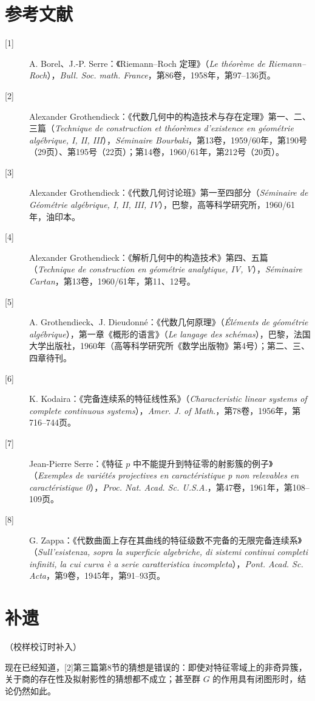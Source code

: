 \section*{参考文献}
\begin{description}
\item[{[1]}] A. Borel、J.-P. Serre：《Riemann--Roch 定理》（\textit{Le théorème de Riemann--Roch}），\textit{Bull. Soc. math. France}，第86卷，1958年，第97--136页。
\item[{[2]}] Alexander Grothendieck：《代数几何中的构造技术与存在定理》第一、二、三篇（\textit{Technique de construction et théorèmes d'existence en géométrie algébrique, I, II, III}），\textit{Séminaire Bourbaki}，第13卷，1959/60年，第190号（29页）、第195号（22页）；第14卷，1960/61年，第212号（20页）。
\item[{[3]}] Alexander Grothendieck：《代数几何讨论班》第一至四部分（\textit{Séminaire de Géométrie algébrique, I, II, III, IV}），巴黎，高等科学研究所，1960/61年，油印本。
\item[{[4]}] Alexander Grothendieck：《解析几何中的构造技术》第四、五篇（\textit{Technique de construction en géométrie analytique, IV, V}），\textit{Séminaire Cartan}，第13卷，1960/61年，第11、12号。
\item[{[5]}] A. Grothendieck、J. Dieudonné：《代数几何原理》（\textit{Éléments de géométrie algébrique}），第一章《概形的语言》（\textit{Le langage des schémas}），巴黎，法国大学出版社，1960年（高等科学研究所《数学出版物》第4号）；第二、三、四章待刊。
\item[{[6]}] K. Kodaira：《完备连续系的特征线性系》（\textit{Characteristic linear systems of complete continuous systems}），\textit{Amer. J. of Math.}，第78卷，1956年，第716--744页。
\item[{[7]}] Jean-Pierre Serre：《特征 $p$ 中不能提升到特征零的射影簇的例子》（\textit{Exemples de variétés projectives en caractéristique p non relevables en caractéristique 0}），\textit{Proc. Nat. Acad. Sc. U.S.A.}，第47卷，1961年，第108--109页。
\item[{[8]}] G. Zappa：《代数曲面上存在其曲线的特征级数不完备的无限完备连续系》（\textit{Sull'esistenza, sopra la superficie algebriche, di sistemi continui completi infiniti, la cui curva è a serie caratteristica incompleta}），\textit{Pont. Acad. Sc. Acta}，第9卷，1945年，第91--93页。
\end{description}

\section*{补遗}
\begin{center}（校样校订时补入）\end{center}
现在已经知道，[2]第三篇第8节的猜想是错误的：即使对特征零域上的非奇异簇，关于商的存在性及拟射影性的猜想都不成立；甚至群 $G$ 的作用具有闭图形时，结论仍然如此。
